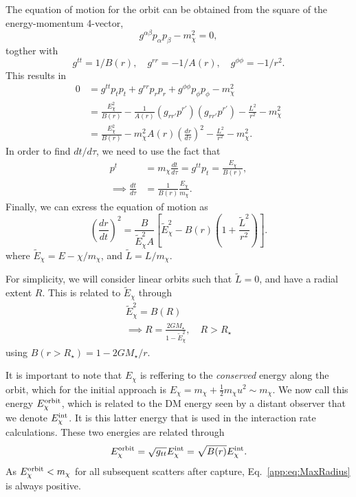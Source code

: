 The equation of motion for the orbit can be obtained from the square of the energy-momentum 4-vector,
\begin{equation}
g^{\alpha\beta} p_\alpha p_\beta - m_\chi^2 = 0,
\end{equation}
togther with
\begin{equation}    
g^{tt} = 1/B(r),\quad g^{rr} = -1/A(r),\quad g^{\phi \phi} = -1/r^2.
\end{equation}
This results in
\begin{align}
    0 & = g^{tt} p_t p_t + g^{rr} p_r p_r + g^{\phi\phi} p_\phi p_\phi - m_\chi^2 \\
    & = \frac{E_\chi^2}{B(r)} - \frac{1}{A(r)} \left( g_{rr'} p^{r'} \right)\left( g_{rr'} p^{r'} \right) - \frac{L^2}{r^2} - m_\chi^2 \\
    & = \frac{E_\chi^2}{B(r)} - m_\chi^2 A(r) \left( \frac{dr}{d\tau} \right)^2 - \frac{L^2}{r^2} - m_\chi^2.
\end{align}
In order to find $dt/d\tau$, we need to use the fact that
\begin{align}
    p^t & = m_\chi \frac{dt}{d\tau} = g^{tt}p_t = \frac{E_\chi}{B(r)},\\
    \implies \frac{dt}{d\tau} & = \frac{1}{B(r)}\frac{E_\chi}{m_\chi}.
\end{align}
Finally, we can exress the equation of motion as
\begin{equation}
    \left(\frac{dr}{dt} \right)^2 = \frac{B}{\tilde E_\chi^2 A} \left[\tilde E_\chi^2- B(r) \left(  1 + \frac{\tilde L^2}{r^2} \right) \right].
    \label{app:eq:drdt2GR}
\end{equation}
where $\tilde{E}_\chi = E-\chi/m_\chi$, and $\tilde{L} = L/m_\chi$.

For simplicity, we will consider linear orbits such that $\tilde L = 0$, and have a radial extent $R$. This is related to $\tilde E_\chi$ through
\begin{gather}
    \tilde E_\chi^2 = B(R)\label{app:eq:maxradgeneral}\\
    \implies R = \frac{2 G M_\star}{1 - \tilde E_\chi^2}, \quad R>R_\star
    \label{app:eq:MaxRadius}
\end{gather}
using $B(r>R_\star) = 1 - 2 G M_\star /r$.

It is important to note that $E_\chi$ is reffering to the \textit{conserved} energy along the orbit, 
which for the initial approach is $E_\chi = m_\chi + \frac{1}{2}m_\chi u^2\sim m_\chi$. 
We now call this energy $E_\chi^{\rm orbit}$, which is related to the DM energy seen by a distant observer that we denote $E_\chi^{\rm int}$. It is this latter energy that is used in the interaction rate calculations. These two energies are related through 
\begin{equation}
    E_\chi^{\rm orbit} = \sqrt{g_{tt}} E_\chi^{\rm int} = \sqrt{B(r)}E_\chi^{\rm int}.
\end{equation}
As $E_\chi^{\rm orbit} < m_\chi$ for all subsequent scatters after capture, Eq.~\ref{app:eq:MaxRadius} is always positive.

